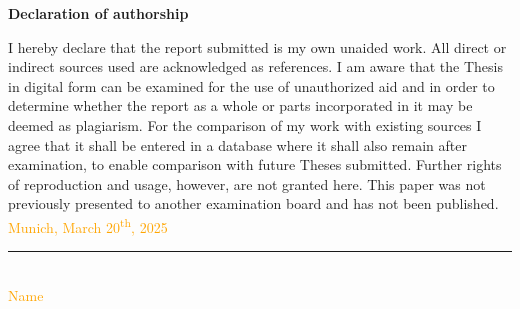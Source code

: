 \documentclass[12pt]{article}
\begin{document}
	
	\Large
	\noindent
	\textbf{Declaration of authorship} 
	\vspace{0.5cm}
	\noindent
	\normalsize
	
	I hereby declare that the report submitted is my own unaided work. All direct 
	or indirect sources used are acknowledged as references. I am aware that the 
	Thesis in digital form can be examined for the use of unauthorized aid and in 
	order to determine whether the report as a whole or parts incorporated in it may 
	be deemed as plagiarism. For the comparison of my work with existing sources I 
	agree that it shall be entered in a database where it shall also remain after 
	examination, to enable comparison with future Theses submitted. Further rights 
	of reproduction and usage, however, are not granted here. This paper was not 
	previously presented to another examination board and has not been published.
	\\
	
	\vspace{1cm}
	\textcolor{orange}{Munich, March 20\textsuperscript{th}, 2025 } \\
	
	\vspace{3cm}
	
	\noindent\rule{0.5\textwidth}{0.4pt} \\
	
	\textcolor{orange}{Name}
	
	
\end{document}
